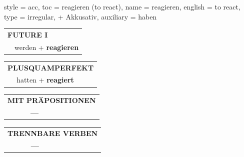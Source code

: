 \begin{verbentry}{
  style = {acc},
  toc = {reagieren (to react)},
  name = {reagieren},
  english = {to react},
  type = {irregular, + Akkusativ},
  auxiliary = {haben}
}
\begin{tabular}{rl}
    \multicolumn{2}{l}{\textbf{FUTURE I} }\\
  &  werden + \textbf{reagieren}\\
 
  \end{tabular}
\hfill
   \begin{tabular}{rl}
      \multicolumn{2}{l}{\textbf{PLUSQUAMPERFEKT}}\\
  &  hatten + \textbf{reagiert}\\
  \end{tabular}
  
  
\vspace{10pt}

\begin{tabular}{lll}
\multicolumn{3}{l}{\textbf{MIT PRÄPOSITIONEN}}\\
& \textbf{---} & \\
\end{tabular}
\hfill
\begin{tabular}{lll}
\multicolumn{3}{l}{\textbf{TRENNBARE VERBEN}}\\
& \textbf{---} & \\
\end{tabular}
\vspace{-5pt}
\end{verbentry}

